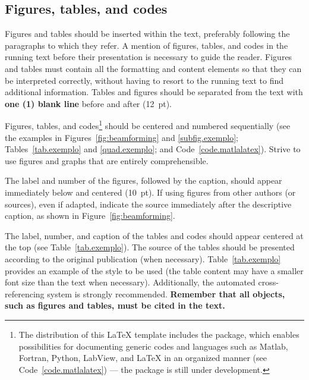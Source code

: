 \subsection{Figures, tables, and codes}

Figures and tables should be inserted within the text, preferably following the paragraphs to which they refer. A mention of figures, tables, and codes in the running text before their presentation is necessary to guide the reader. Figures and tables must contain all the formatting and content elements so that they can be interpreted correctly, without having to resort to the running text to find additional information.  Tables and figures should be separated from the text with \textbf{one (1) blank line} before and after (12~pt).


Figures, tables, and codes\footnote{The distribution of this \LaTeX\xspace template includes the  package, which enables possibilities for documenting generic codes and languages such as Matlab, Fortran, Python, LabView, and LaTeX in an organized manner (see Code~\ref{code.matlalatex}) --- the package is still under development.} should be centered and numbered sequentially (see the examples in Figures~\ref{fig:beamforming} and \ref{subfig.exemplo}; Tables~\ref{tab.exemplo} and \ref{quad.exemplo}; and Code~\ref{code.matlalatex}). Strive to use figures and graphs that are entirely comprehensible.

The label and number of the figures, followed by the caption, should appear immediately below and centered (10~pt). If using figures from other authors (or sources), even if adapted, indicate the source immediately after the descriptive caption, as shown in Figure~\ref{fig:beamforming}.

The label, number, and caption of the tables and codes should appear centered at the top (see Table~\ref{tab.exemplo}). The source of the tables should be presented according to the original publication (when necessary). Table~\ref{tab.exemplo} provides an example of the style to be used (the table content may have a smaller font size than the text when necessary). Additionally, the automated cross-referencing system is strongly recommended. \textbf{Remember that all objects, such as figures and tables, must be cited in the text.}

